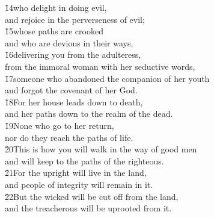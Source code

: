 \begin{poetry}
\poeml \v{14}who delight in doing evil, \\
\poemll    and rejoice in the perverseness of evil; \\
\poeml \v{15}whose paths are crooked \\
\poemll    and who are devious in their ways, \\
\poeml \v{16}delivering you from the adulteress, \\
\poemll    from the immoral woman with her seductive words, \\
\poeml \v{17}someone who abandoned the companion of her youth \\
\poemlll       and forgot the covenant of her God. \\
\poeml \v{18}For her house leads down to death, \\
\poemll    and her paths down to the realm of the dead. \\
\poeml \v{19}None who go to her return, \\
\poeml nor do they reach the paths of life. \\
\poeml \v{20}This is how you will walk in the way of good men \\
\poemll    and will keep to the paths of the righteous. \\
\poeml \v{21}For the upright will live in the land, \\
\poemll    and people of integrity will remain in it. \\
\poeml \v{22}But the wicked will be cut off from the land, \\
\poemll    and the treacherous will be uprooted from it.
\end{poetry}

